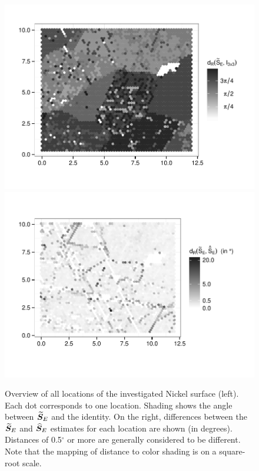 \begin{figure}[htbp] %
   \centering
   \vspace{-.15in}
   \includegraphics[width=.49\textwidth]{images/grain-map.pdf} 
   \includegraphics[width=.49\textwidth]{images/grain-diff.pdf} 
    \vspace{-.175in} 
   \caption{ \label{fig:grain-map}Overview of all locations of the investigated Nickel surface (left). Each dot corresponds to one location.  Shading shows the angle between ${\widetilde{\bm S}_E}$ and the identity. On the right, differences between the ${\widetilde{\bm S}_E}$ and ${\widehat{\bm S}_E}$ estimates for each location are shown (in degrees). Distances of 0.5$^\circ$ or more are generally considered to be different. Note that the mapping of distance to color shading is on a square-root scale.}
\end{figure}
\vspace{-0.25cm}
